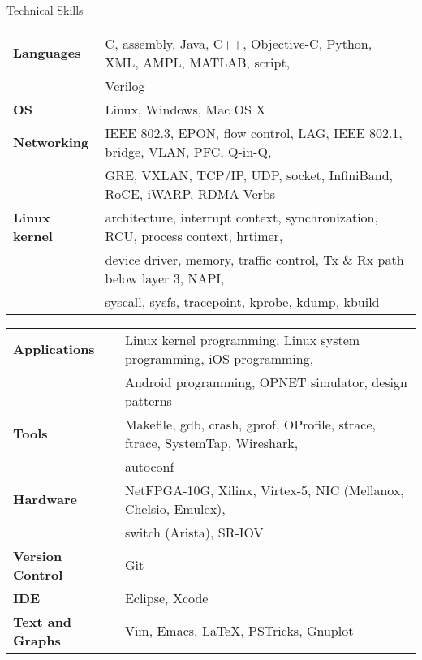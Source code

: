 \documentclass{resume} %
\begin{document}
\begin{rSection}{Technical Skills}

\begin{tabular}{ @{} >{\bfseries}l @{\hspace{6ex}} l }
Languages & C, assembly, Java, C++, Objective-C, Python, XML, AMPL, MATLAB, script, \\
& Verilog \\
OS & Linux, Windows, Mac OS X \\
Networking & IEEE 802.3, EPON, flow control, LAG, IEEE 802.1, bridge, VLAN, PFC, Q-in-Q, \\
& GRE, VXLAN, TCP/IP, UDP, socket, InfiniBand, RoCE, iWARP, RDMA Verbs \\
Linux kernel & architecture, interrupt context, synchronization, RCU, process context, hrtimer, \\
& device driver, memory, traffic control, Tx \& Rx path below layer 3, NAPI, \\
& syscall, sysfs, tracepoint, kprobe, kdump, kbuild \\
\end{tabular}

\begin{tabular}{ @{} >{\bfseries}l @{\hspace{6ex}} l }
Applications & Linux kernel programming, Linux system programming, iOS programming, \\
& Android programming, OPNET simulator, design patterns \\
Tools & Makefile, gdb, crash, gprof, OProfile, strace, ftrace, SystemTap, Wireshark, \\
& autoconf \\
Hardware & NetFPGA-10G, Xilinx, Virtex-5, NIC (Mellanox, Chelsio, Emulex), \\
& switch (Arista), SR-IOV \\
Version Control & Git \\
IDE & Eclipse, Xcode  \\
Text and Graphs & Vim, Emacs, \LaTeX, PSTricks, Gnuplot
\end{tabular}

\end{rSection}



\end{document}
